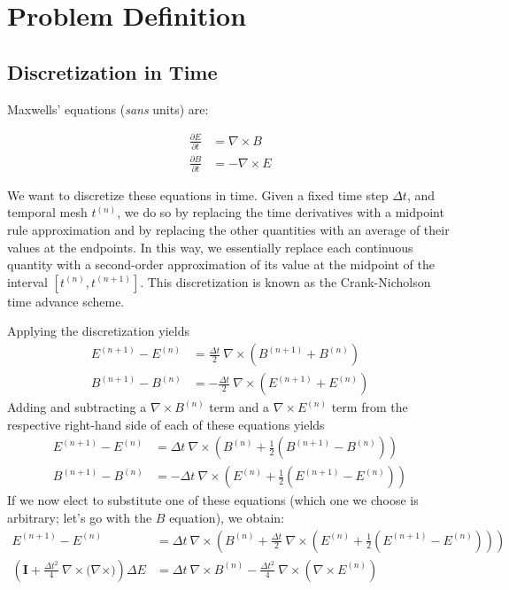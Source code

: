 \documentclass{article}
\newcommand{\dd}[2]{\frac{\partial #1}{\partial #2}}
\newcommand{\Fnijk}[5]{{#1}^{(#2)}_{{#3}{#4}{#5}}}
\newcommand{\Fn}[2]{\Fnijk{#1}{#2}{{}}{{}}{{}}}
\newcommand{\curl}[1]{\nabla \times {#1}}
\newcommand{\Enpo}{\Fn{E}{n+1}}
\newcommand{\Bnpo}{\Fn{B}{n+1}}
\newcommand{\En}{\Fn{E}{n}}
\newcommand{\Bn}{\Fn{B}{n}}
\newcommand{\dt}{\Delta t}
\newcommand{\iden}{\mathbf{I}}
\begin{document}
\section{Problem Definition} 

\subsection{Discretization in Time}
Maxwells' equations ({\it sans} units) are:

\begin{align*}
  \dd{E}{t} &= \curl{B} \\
  \dd{B}{t} &= - \curl{E}
\end{align*}

We want to discretize these equations in time.
Given a fixed time step $\Delta t$, and temporal mesh $\Fn{t}{n}$, we do so by replacing
the time derivatives with a midpoint rule approximation and by replacing
the other quantities with an average of their values at the
endpoints.
In this way, we essentially replace each continuous
quantity with a second-order approximation of its value at the
midpoint of the interval $[\Fn{t}{n}, \Fn{t}{n+1}]$.
This discretization is known as the Crank-Nicholson time advance scheme.

Applying the discretization yields
\begin{align*}
  \Enpo - \En &= \frac{\dt}{2} ~\curl{ ( \Bnpo + \Bn ) } \\
  \Bnpo - \Bn &= - \frac{\dt}{2} ~\curl{ ( \Enpo + \En ) }
\end{align*}
Adding and subtracting a $\curl{\Fn{B}{n}}$ term and a $\curl{\Fn{E}{n}}$ term from the respective right-hand side of each of these equations yields
\begin{align*}
  \Enpo - \En &=  \dt ~\curl{\left( \Bn + \frac{1}{2} (\Bnpo -
      \Bn) \right)} \\
  \Bnpo - \Bn &= - \dt ~\curl{\left( \En + \frac{1}{2} (\Enpo -
      \En) \right)}
\end{align*}
If we now elect to substitute one of these equations (which one we
choose is arbitrary; let's go with the $B$ equation), we obtain:
\begin{align*}
  \Enpo - \En &= \dt ~\curl{\left( \Bn + \frac{\dt}{2}~\curl{\left( \En + \frac{1}{2} (\Enpo -
        \En) \right)} \right)} \\
\left(\iden + \frac{\dt^2}{4} ~\curl{(\curl)} \right) \Delta E &= \dt ~\curl{\Bn} -
\frac{\dt^2}{4} ~\curl{(\curl{\En})}
\end{align*}
\end{document}
